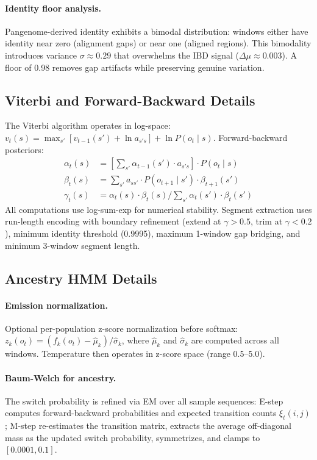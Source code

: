 \documentclass[11pt]{article}
\begin{document}
\paragraph{Identity floor analysis.}
Pangenome-derived identity exhibits a bimodal distribution: windows either have identity near zero (alignment gaps) or near one (aligned regions). This bimodality introduces variance $\sigma \approx 0.29$ that overwhelms the IBD signal ($\Delta\mu \approx 0.003$). A floor of 0.98 removes gap artifacts while preserving genuine variation.

\subsection{Viterbi and Forward-Backward Details}
\label{sec:supp_inference_details}

The Viterbi algorithm operates in log-space: $v_t(s) = \max_{s'}[v_{t-1}(s') + \ln a_{s's}] + \ln P(o_t \mid s)$. Forward-backward posteriors:
\begin{align}
\alpha_t(s) &= \left[\textstyle\sum_{s'} \alpha_{t-1}(s') \cdot a_{s's}\right] \cdot P(o_t \mid s) \\
\beta_t(s) &= \textstyle\sum_{s'} a_{ss'} \cdot P(o_{t+1} \mid s') \cdot \beta_{t+1}(s') \\
\gamma_t(s) &= \alpha_t(s) \cdot \beta_t(s) / \textstyle\sum_{s'} \alpha_t(s') \cdot \beta_t(s')
\end{align}
All computations use log-sum-exp for numerical stability. Segment extraction uses run-length encoding with boundary refinement (extend at $\gamma > 0.5$, trim at $\gamma < 0.2$), minimum identity threshold (0.9995), maximum 1-window gap bridging, and minimum 3-window segment length.

\subsection{Ancestry HMM Details}
\label{sec:supp_ancestry_details}

\paragraph{Emission normalization.}
Optional per-population z-score normalization before softmax: $z_k(o_t) = (f_k(o_t) - \hat{\mu}_k)/\hat{\sigma}_k$, where $\hat{\mu}_k$ and $\hat{\sigma}_k$ are computed across all windows. Temperature then operates in z-score space (range 0.5--5.0).

\paragraph{Baum-Welch for ancestry.}
The switch probability is refined via EM over all sample sequences: E-step computes forward-backward probabilities and expected transition counts $\xi_t(i,j)$; M-step re-estimates the transition matrix, extracts the average off-diagonal mass as the updated switch probability, symmetrizes, and clamps to $[0.0001, 0.1]$.
\end{document}
